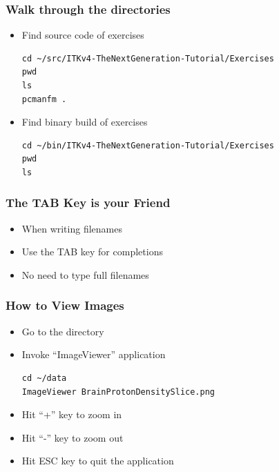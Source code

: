 {
\begin{frame}[fragile]
\frametitle{Walk through the directories}
\begin{itemize}
\item Find source code of exercises
\begin{verbatim}
cd ~/src/ITKv4-TheNextGeneration-Tutorial/Exercises
pwd
ls
pcmanfm .
\end{verbatim}
\pause
\item Find binary build of exercises
\begin{verbatim}
cd ~/bin/ITKv4-TheNextGeneration-Tutorial/Exercises
pwd
ls
\end{verbatim}
\end{itemize}
\end{frame}
}

{
\begin{frame}[fragile]
\frametitle{The TAB Key is your Friend}
\begin{itemize}
\item When writing filenames
\item Use the TAB key for completions
\item No need to type full filenames
\end{itemize}
\end{frame}
}

{
\begin{frame}[fragile]
\frametitle{How to View Images}
\begin{itemize}
\item Go to the directory
\item Invoke ``ImageViewer'' application
\begin{verbatim}
cd ~/data
ImageViewer BrainProtonDensitySlice.png
\end{verbatim}
\pause
\item Hit ``+'' key to zoom in
\pause
\item Hit ``-'' key to zoom out
\pause
\item Hit ESC key to quit the application
\end{itemize}
\end{frame}
}
